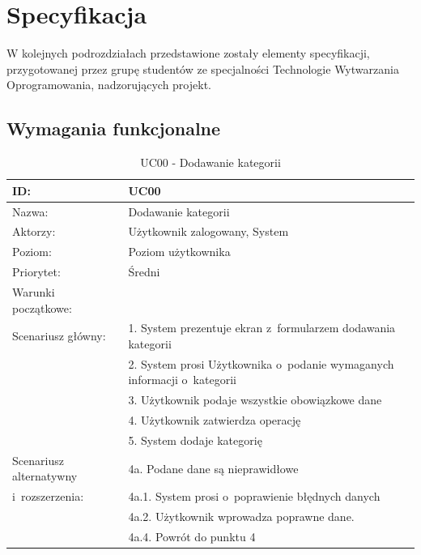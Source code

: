 \chapter{Specyfikacja}

W kolejnych podrozdziałach przedstawione zostały elementy specyfikacji, przygotowanej przez grupę studentów ze specjalności Technologie Wytwarzania Oprogramowania, nadzorujących projekt.

\section{Wymagania funkcjonalne}

\begin{table}[H]
    \begin{tabular}{|p{5cm}|p{9cm}|}\hline
	ID: & UC00 \\\hline
    Nazwa: & Dodawanie kategorii \\\hline
    Aktorzy: & Użytkownik zalogowany, System \\\hline
    Poziom: & Poziom użytkownika  \\\hline
    Priorytet: & Średni \\\hline
    Warunki początkowe: & ~ \\\hline
    Scenariusz główny: & 1. System prezentuje ekran z~formularzem dodawania kategorii \\
    ~ & 2. System prosi Użytkownika o~podanie wymaganych informacji o~kategorii \\
    ~ & 3. Użytkownik podaje wszystkie obowiązkowe dane \\
    ~ & 4. Użytkownik zatwierdza operację \\
    ~ & 5. System dodaje kategorię \\\hline
    Scenariusz alternatywny & 4a. Podane dane są nieprawidłowe \\
    i~rozszerzenia: & 4a.1. System prosi o~poprawienie błędnych danych \\
    ~ & 4a.2. Użytkownik wprowadza poprawne dane. \\
    ~ & 4a.4. Powrót do punktu 4 \\
    \hline\end{tabular}
	\caption{UC00 - Dodawanie kategorii}
\end{table}

